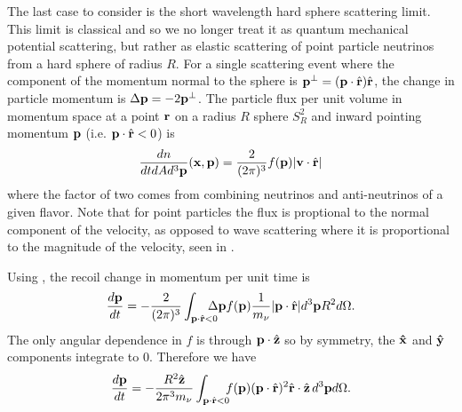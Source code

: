 The last case to consider is the short wavelength hard sphere scattering limit.  This limit is classical and so we no longer treat it as quantum mechanical potential scattering, but rather as elastic scattering of point particle neutrinos from a hard sphere of radius $R$.  For a single scattering event where the component of the momentum normal to the sphere is ${\bf p}^\perp=({\bf p}\cdot \hat {\bf r}) \hat {\bf r}$, the change in particle momentum is  $\Delta {\bf p}=-2{\bf p}^\perp$. The particle flux per unit volume in momentum space at a point ${\bf r}$ on a radius $R$ sphere $S_R^2$ and inward pointing momentum ${\bf p}$ (i.e. ${\bf p}\cdot \hat{\bf  r}<0$) is
\begin{equation}\label{dn_classical}
\frac{dn}{dtd Ad^3{\bf p}}({\bf x},{\bf p})=\frac{2}{(2\pi)^3}f({\bf p})|{\bf v}\cdot \hat{\bf r}|
\end{equation}
where the factor of two comes from combining neutrinos and anti-neutrinos of a given flavor.  Note that for point particles the flux is proptional to the normal component of the velocity, as opposed to wave scattering where it is proportional to the magnitude of the velocity, seen in .

Using , the recoil change in momentum per unit time is  
\begin{equation}
\frac{d{\bf p}}{dt}= -\frac{2}{(2\pi)^3}\int_{{\bf p}\cdot \hat{\bf r}<0} \!\!\!\!\!\!\Delta {\bf p}  f({\bf p}) \frac{1}{m_\nu}|{\bf p}\cdot \hat{\bf r}| d^3{\bf p}R^2d\Omega.
\end{equation}
The only angular dependence in $f$ is through ${\bf p}\cdot \hat {\bf z}$ so by symmetry, the ${\bf \hat x}$ and ${\bf \hat y}$ components integrate to $0$.  Therefore we have
\begin{equation}
\frac{d{\bf p}}{dt}=-\frac{R^2\hat{\bf z}}{2\pi^3m_\nu}\int_{{\bf p}\cdot \hat{\bf r}<0}\!\!\!   f({\bf p}) ({\bf p}\cdot \hat{\bf r})^2 \hat {\bf r}\cdot\hat{\bf z}\, d^3{\bf p}d\Omega.  
\end{equation}

